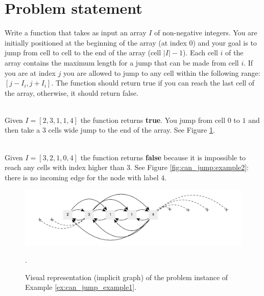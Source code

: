 \section{Problem statement}
\label{ch:can_jump:statement}
\begin{exercise}
Write a function that takes as input an array $I$ of non-negative integers. You are initially
positioned at the beginning of the array (at index $0$) and your goal is to jump from cell to cell
to the end of the array (cell $|I|-1$).
Each cell $i$ of the array contains the maximum length for a jump that can be made from cell $i$.
If you are at index $j$ you are allowed to jump to any cell within the following range: $[j-I_i,j+I_i]$.
The function should return true if you can reach the last cell of the array, otherwise, it should return false.

    \begin{example}
        \hfill \\
        Given  $I=[2,3,1,1,4]$ the function returns \textbf{true}. You jump from cell $0$ to $1$ and
        then take a $3$ cells wide jump to the end of the array. See Figure
        \ref{fig:can_jump:example1}.
        \label{ex:can_jump_example1}
    \end{example}

    \begin{example}
        \hfill \\
        Given $I=[3,2,1,0,4]$ the function returns \textbf{false} because it is impossible to reach
        any cells with index higher than $3$. See Figure \ref{fig:can_jump:example2}: there is no
        incoming edge for the node with label $4$.
        \label{ex:can_jump_example2}
    \end{example}
\end{exercise}

\begin{figure}
    \centering
    \includegraphics[width=\textwidth]{sources/can_jump/images/can_jump_example1}
    \caption[Implicit graph for the Example \ref{ex:can_jump_example1}.]
    {Visual representation (implicit graph) of the problem instance of Example
    \ref{ex:can_jump_example1}.}.
    \label{fig:can_jump:example1}
\end{figure}

